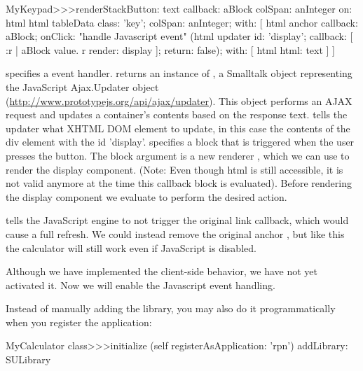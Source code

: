 \documentclass[a4paper,10pt,twoside]{book}
\begin{document}
\begin{code}{}
MyKeypad>>>renderStackButton: text callback: aBlock colSpan: anInteger on: html 
	html tableData
		class: 'key';
		colSpan: anInteger;
		with: [
			html anchor
				callback: aBlock;
				onClick:				"handle Javascript event"
					(html updater
						id: 'display';
						callback: [ :r |
							aBlock value.
							r render: display ];
						return: false);
				with: [ html html: text ] ]
\end{code}

 specifies a  event handler.
 returns an instance of , a Smalltalk object representing the JavaScript Ajax.Updater object (\url{http://www.prototypejs.org/api/ajax/updater}).
This object performs an AJAX request and updates a container's contents based on the response text.
 tells the updater what XHTML DOM element to update, in this case the contents of the div element with the id 'display'.
 specifies a block that is triggered when the user presses the button.
The block argument is a new renderer , which we can use to render the display component.
(Note: Even though html is still accessible, it is not valid anymore at the time this callback block is evaluated).
Before rendering the display component we evaluate  to perform the desired action.

 tells the JavaScript engine to not trigger the original link callback, which would cause a full refresh.
We could instead remove the original anchor , but like this the calculator will still work even if JavaScript is disabled.


Although we have implemented the client-side behavior, we have not yet activated it.
Now we will enable the Javascript event handling.


Instead of manually adding the library, you may also do it programmatically when you register the application:
\begin{code}{}
MyCalculator class>>>initialize
	(self registerAsApplication: 'rpn')
		addLibrary: SULibrary
\end{code}
\end{document}
